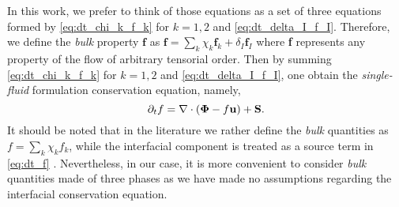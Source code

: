 In this work, we prefer to think of those equations as a set of three equations formed by \ref{eq:dt_chi_k_f_k} for $k=1,2$ and \ref{eq:dt_delta_I_f_I}. 
Therefore, we define the \textit{bulk} property $\textbf{f}$ as $\textbf{f} = \sum_k \chi_k \textbf{f}_k + \delta_I \textbf{f}_I$ where \textbf{f} represents any property of the flow of arbitrary tensorial order.
Then by summing \ref{eq:dt_chi_k_f_k} for $k=1,2$ and \ref{eq:dt_delta_I_f_I}, one obtain the \textit{single-fluid} formulation conservation equation, namely,
\begin{equation}
    \partial_t f
    = \mathbf{\nabla} \cdot (\mathbf{\Phi} - f \textbf{u})
    + \textbf{S}. 
    \label{eq:dt_f}
\end{equation}
It should be noted that in the literature we rather define the \textit{bulk} quantities as $f = \sum_k \chi_k f_k$, while the interfacial component is treated as a source term in \ref{eq:dt_f} \citep{morel2015mathematical,tryggvason2011direct,drew1983mathematical}. 
Nevertheless, in our case, it is more convenient to consider \textit{bulk} quantities made of three phases as we have made no assumptions regarding the interfacial conservation equation. 
